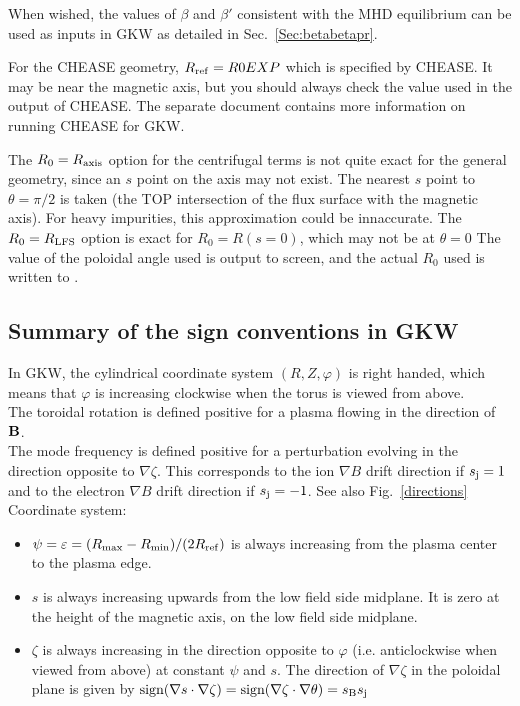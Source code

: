 When wished, the values of $\beta$ and $\beta'$ consistent with the MHD equilibrium can be used as inputs in GKW as detailed in
Sec.~\ref{Sec:betabetapr}. 

For the CHEASE geometry, $R_{\rm ref} = R0EXP $ which is specified by CHEASE. It may be near the magnetic axis, but
you should always check the value used in the  output of CHEASE.  The separate document
 contains more information on running CHEASE for GKW.

The $R_0=R_{\rm axis}$ option for the centrifugal terms is not quite exact for the general geometry, 
since an $s$ point on the axis may not exist.
The nearest $s$ point to $\theta=\pi/2$ is taken (the TOP intersection of the flux surface with the
magnetic axis).  For heavy impurities, this approximation could be innaccurate.  
The $R_0=R_{\rm LFS}$ option is exact for $R_0=R(s=0)$, which may not be at $\theta=0$
The value of the poloidal angle used is output to screen, and the actual $R_0$ used is written to .

\subsection{Summary of the sign conventions in GKW} 
\label{signs}
In GKW, the cylindrical coordinate system $(R,Z,\varphi)$ is right handed, which means that $\varphi$ is increasing clockwise when the torus is viewed from above.\\
The toroidal rotation is defined positive for a plasma flowing in the direction of ${\bf B}$.\\
The mode frequency is defined positive for a perturbation evolving in the direction opposite to $\nabla \zeta$. This corresponds to the ion $\nabla B$ drift direction if $s_{\rm j}=1$ and to the
electron $\nabla B$ drift direction if $s_{\rm j}=-1$.  See also Fig.~\ref{directions}\\
Coordinate system:
\begin{itemize}
 \item $\psi=\varepsilon=(R_{\rm max}-R_{\rm min})/(2R_{\rm ref})$ is always increasing from the plasma center to the plasma edge.
 \item $s$ is always increasing upwards from the low field side midplane. It is zero at the height of the magnetic axis, on the low field side midplane.
 \item $\zeta$ is always increasing in the direction opposite to $\varphi$ (i.e. anticlockwise when viewed from above) at constant $\psi$ and $s$. The direction of $\nabla \zeta$ in the poloidal plane is
given by $\textrm{sign}(\nabla s \cdot \nabla \zeta)=\textrm{sign}(\nabla 
\zeta \cdot \nabla \theta)=s_{\rm B}s_{\rm j}$
\end{itemize}

